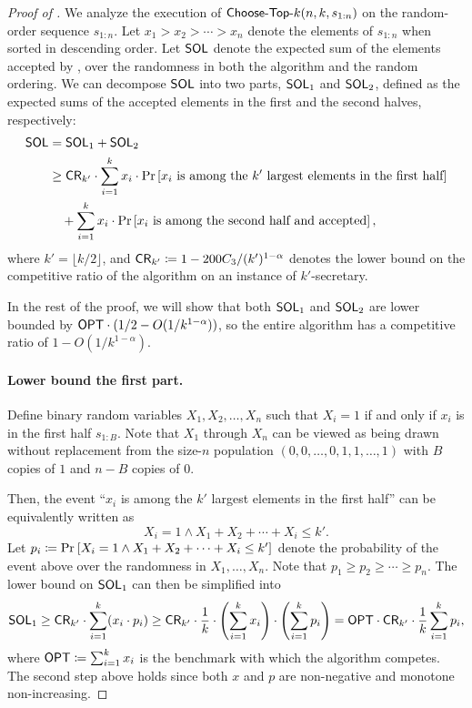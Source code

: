 \begin{proof}[Proof of ]
We analyze the execution of $\textsf{Choose-Top-}k(n, k, s_{1:n})$ on the random-order sequence $s_{1:n}$. Let $x_1 > x_2 > \cdots > x_n$ denote the elements of $s_{1:n}$ when sorted in descending order. Let $\mathsf{SOL}$ denote the expected sum of the elements accepted by , over the randomness in both the algorithm and the random ordering. We can decompose $\mathsf{SOL}$ into two parts, $\mathsf{SOL}_1$ and $\mathsf{SOL}_2$, defined as the expected sums of the accepted elements in the first and the second halves, respectively:
\begin{align*}
        \mathsf{SOL}
&=      \mathsf{SOL}_1 + \mathsf{SOL}_2\\
&\ge    \mathsf{CR}_{k'} \cdot\sum_{i=1}^k x_i\cdot \Pr_{}\left[\text{$x_i$ is among the $k'$ largest elements in the first half}\right]\\
&\quad + \sum_{i=1}^k x_i\cdot \Pr_{}\left[\text{$x_i$ is among the second half and accepted}\right],
\end{align*}
where $k' = \lfloor k/2\rfloor$, and $\mathsf{CR}_{k'} \coloneqq 1 - 200C_3 / (k')^{1 - \alpha}$ denotes the lower bound on the competitive ratio of the algorithm on an instance of $k'$-secretary.

In the rest of the proof, we will show that both $\mathsf{SOL}_1$ and $\mathsf{SOL}_2$ are lower bounded by $\mathsf{OPT} \cdot (1/2 - O(1/k^{1 - \alpha}))$, so the entire algorithm has a competitive ratio of $1 - O(1/k^{1-\alpha})$.

\paragraph{Lower bound the first part.} Define binary random variables $X_1, X_2, \ldots, X_n$ such that $X_i = 1$ if and only if $x_i$ is in the first half $s_{1:B}$. Note that $X_1$ through $X_n$ can be viewed as being drawn without replacement from the size-$n$ population $(0, 0, \ldots, 0, 1, 1, \ldots, 1)$ with $B$ copies of $1$ and $n - B$ copies of $0$.

Then, the event ``$x_i$ is among the $k'$ largest elements in the first half'' can be equivalently written as
\[
    X_i = 1 \wedge X_1 + X_2 + \cdots + X_i \le k'.
\]
Let $p_i \coloneqq \Pr_{}\left[X_i = 1 \wedge X_1 + X_2 + \cdots + X_i \le k'\right]$ denote the probability of the event above over the randomness in $X_1, \ldots, X_n$. Note that $p_1 \ge p_2 \ge \cdots \ge p_n$. The lower bound on $\mathsf{SOL}_1$ can then be simplified into
\[
    \mathsf{SOL}_1
\ge \mathsf{CR}_{k'}\cdot\sum_{i=1}^{k}(x_i\cdot p_i)
\ge \mathsf{CR}_{k'}\cdot\frac{1}{k}\cdot\left(\sum_{i=1}^{k}x_i\right)\cdot\left(\sum_{i=1}^{k}p_i\right)
=   \mathsf{OPT}\cdot \mathsf{CR}_{k'}\cdot\frac{1}{k}\sum_{i=1}^{k}p_i,
\]
where $\mathsf{OPT} \coloneqq \sum_{i=1}^{k}x_i$ is the benchmark with which the algorithm competes. The second step above holds since both $x$ and $p$ are non-negative and monotone non-increasing.


\end{proof}
